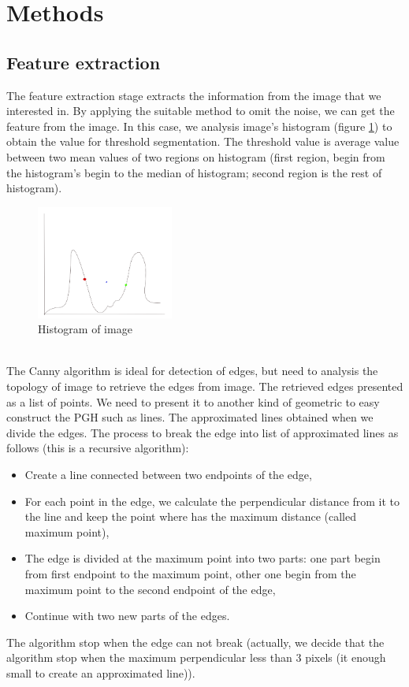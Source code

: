 \documentclass[11pt, twocolumn, a4paper]{article}
\begin{document}
\section{Methods}
\subsection{Feature extraction}
The feature extraction stage extracts the information from the image that we interested in. By applying the suitable method to omit the noise, we can get the feature from the image. In this case, we analysis image's histogram (figure \ref{lm_hist}) to obtain the value for threshold segmentation. The threshold value is average value between two mean values of two regions on histogram (first region, begin from the histogram's begin to the median of histogram; second region is the rest of histogram).\\
\begin{figure}[h!]
\centering
\includegraphics[width=0.4\textwidth]{./images/hist}
\caption{Histogram of image}
\label{lm_hist}
\end{figure}~\\
The Canny\cite{canny1986computational} algorithm is ideal for detection of edges, but need to analysis the topology\cite{suzuki1985topological} of image to retrieve the edges from image. The retrieved edges presented as a list of points. We need to present it to another kind of geometric to easy construct the PGH such as lines. The approximated lines obtained when we divide the edges. The process to break the edge into list of approximated lines as follows (this is a recursive algorithm\cite{thacker1995assessing}):
\begin{itemize}
	\item Create a line connected between two endpoints of the edge,
	\item For each point in the edge, we calculate the perpendicular distance from it to the line and keep the point where has the maximum distance (called maximum point),
	\item The edge is divided at the maximum point into two parts: one part begin from first endpoint to the maximum point, other one begin from the maximum point to the second endpoint of the edge,
	\item Continue with two new parts of the edges.
\end{itemize}
The algorithm stop when the edge can not break (actually, we decide that the algorithm stop when the maximum perpendicular less than 3 pixels (it enough small to create an approximated line)).
\end{document}
